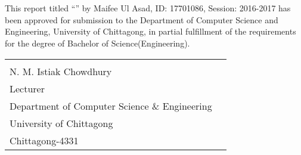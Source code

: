 

\chapter*{}

This report titled “” by Maifee Ul Asad, ID: 17701086, Session: 2016-2017 has been approved for submission to the Department of Computer Science and Engineering, University of
Chittagong, in partial fulfillment of the requirements for the degree of Bachelor of
Science(Engineering).

\vspace*{\fill}

\begin{tabular}{@{}p{3.5in}p{2.5in}@{}}
  \hrulefill\\
  N. M. Istiak Chowdhury\\
  Lecturer\\
  Department of Computer Science \& Engineering\\
  University of Chittagong\\
  Chittagong-4331
\end{tabular}